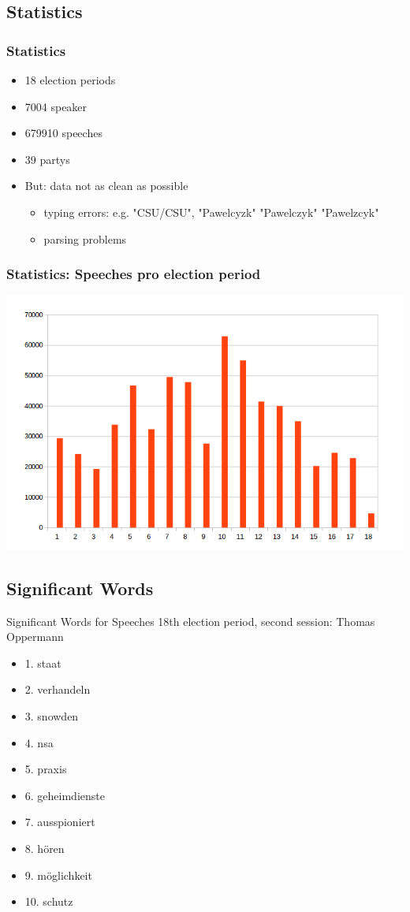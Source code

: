 \documentclass[11pt, a4paper]{beamer}
\begin{document}
\subsection{Statistics}
\begin{frame}
\frametitle{Statistics}
\begin{itemize}
\item 18 election periods
\item 7004 speaker
\item 679910 speeches
\item 39 partys
\item But: data not as clean as possible
\begin{itemize}
\item typing errors: e.g. "CSU/CSU", "Pawelcyzk" "Pawelczyk" "Pawelzcyk"
\item parsing problems
\end{itemize}
\end{itemize}
\end{frame}

\begin{frame}
\frametitle{Statistics: Speeches pro election period}
\includegraphics[scale=0.4]{speechperperiod.png}
\end{frame}

\subsection{Significant Words}
\begin{frame}{Significant Words for Speeches}
18th election period, second session: Thomas Oppermann
\begin{itemize}
\item 1. staat
\item 2. verhandeln
\item 3. snowden
\item 4. nsa
\item 5. praxis
\item 6. geheimdienste
\item 7. ausspioniert
\item 8. hören
\item 9. möglichkeit
\item 10. schutz
\end{itemize}
\end{frame}
\end{document}
